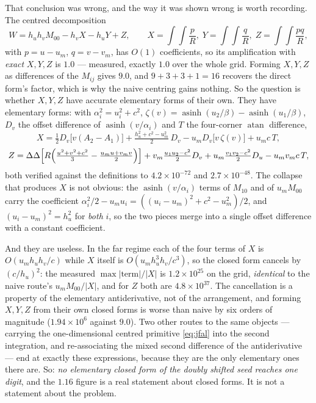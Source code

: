 \documentclass[11pt]{article}
\theoremstyle{remark}
\newcommand{\asinh}{\operatorname{asinh}}
\newcommand{\atan}{\operatorname{atan}}
\begin{document}
That conclusion was wrong, and the way it was shown wrong is worth recording. The centred
decomposition
\begin{equation}
W = h_uh_v M_{00} - h_v X - h_u Y + Z,
\qquad X = \int\!\!\int\frac{p}{R},\; Y = \int\!\!\int\frac{q}{R},\; Z = \int\!\!\int\frac{pq}{R},
\end{equation}
with $p = u-u_m$, $q = v-v_m$, has $O(1)$ coefficients, so its amplification with
\emph{exact} $X, Y, Z$ is $1.0$ --- measured, exactly $1.0$ over the whole grid. Forming
$X, Y, Z$ as differences of the $M_{ij}$ gives $9.0$, and $9+3+3+1 = 16$ recovers the
direct form's factor, which is why the naive centring gains nothing. So the question is
whether $X, Y, Z$ have accurate elementary forms of their own. They have elementary forms:
with $\alpha_i^2 = u_i^2+c^2$, $\zeta(v) = \asinh(u_2/\beta) - \asinh(u_1/\beta)$,
$D_v$ the offset difference of $\asinh(v/\alpha_i)$ and $T$ the four-corner $\atan$
difference,
\begin{equation}
X = \tfrac12 D_v\bigl[v(A_2-A_1)\bigr] + \tfrac{h_u^2+c^2-u_m^2}{2}\,D_v
 - u_m D_v\bigl[v\,\zeta(v)\bigr] + u_m c\,T,
\end{equation}
\begin{equation}
Z = \Delta\Delta\Bigl[R\Bigl(\tfrac{u^2+v^2+c^2}{3} - \tfrac{u_mu + v_mv}{2}\Bigr)\Bigr]
 + v_m\tfrac{u_1u_2-c^2}{2}D_v + u_m\tfrac{v_1v_2-c^2}{2}D_u - u_mv_m c\,T,
\end{equation}
both verified against the definitions to $4.2\times10^{-72}$ and $2.7\times10^{-48}$. The
collapse that produces $X$ is not obvious: the $\asinh(v/\alpha_i)$ terms of $M_{10}$ and
of $u_mM_{00}$ carry the coefficient
$\alpha_i^2/2 - u_mu_i = ((u_i-u_m)^2 + c^2 - u_m^2)/2$, and $(u_i-u_m)^2 = h_u^2$ for
\emph{both} $i$, so the two pieces merge into a single offset difference with a constant
coefficient.

And they are useless. In the far regime each of the four terms of $X$ is
$O(u_mh_uh_v/c)$ while $X$ itself is $O(u_mh_u^3h_v/c^3)$, so the closed form cancels by
$(c/h_u)^2$: the measured $\max|\mathrm{term}|/|X|$ is $1.2\times10^{25}$ on the grid,
\emph{identical} to the naive route's $u_mM_{00}/|X|$, and for $Z$ both are
$4.8\times10^{37}$. The cancellation is a property of the elementary antiderivative, not
of the arrangement, and forming $X, Y, Z$ from their own closed forms is worse than naive
by six orders of magnitude ($1.94\times10^{6}$ against $9.0$). Two other routes to the
same objects --- carrying the one-dimensional centred primitive \eqref{eq:jfal} into the
second integration, and re-associating the mixed second difference of the antiderivative
--- end at exactly these expressions, because they are the only elementary ones there are.
So: \emph{no elementary closed form of the doubly shifted seed reaches one digit}, and the
$1.16$ figure is a real statement about closed forms. It is not a statement about the
problem.
\end{document}
